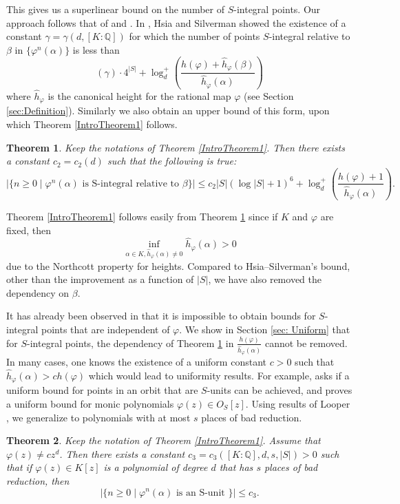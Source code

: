 \documentclass[10pt, reqno]{amsart}
\newcommand{\bb}{\mathbb}
\newcommand{\vphi}{\varphi}
\newcommand{\h}{\widehat{h}}
\newtheorem{theorem}{Theorem}
\numberwithin{theorem}{section}
\numberwithin{equation}{section}
\numberwithin{example}{section}
\numberwithin{definition}{section}
\begin{document}
This gives us a superlinear bound on the number of $S$-integral points.  Our approach follows that of \cite{Sil93} and \cite{HS11}. In \cite{HS11}, Hsia and Silverman showed the existence of a constant $\gamma = \gamma(d,[K:\bb{Q}])$ for which the number of points $S$-integral relative to $\beta$ in $\{\vphi^n(\alpha)\}$ is less than
$$(\gamma) \cdot 4^{|S|}  + \log_d^+ \left( \frac{h(\vphi) + \h_{\vphi}(\beta)}{\h_{\vphi}(\alpha)} \right)$$
where $\h_{\vphi}$ is the canonical height for the rational map $\vphi$ (see Section \ref{sec:Definition}). 
Similarly we also obtain an upper bound of this form, upon which Theorem \ref{IntroTheorem1} follows. 

\begin{theorem} \label{IntroTheorem3}
Keep the notations of Theorem \ref{IntroTheorem1}. Then there exists a constant $c_2 = c_2(d)$ such that the following is true: 
$$|\{ n \geq 0 \mid \vphi^n(\alpha) \text{ is S-integral relative to } \beta\}| \leq c_2 |S| (\log |S|+1)^6 + \log_d^+ \left(\frac{h(\vphi) + 1}{\h_{\vphi}(\alpha)} \right).$$
\end{theorem}

Theorem \ref{IntroTheorem1} follows easily from Theorem \ref{IntroTheorem3} since if $K$ and $\vphi$ are fixed, then 
$$\inf_{\alpha \in K, \h_{\vphi}(\alpha) \not = 0} \h_{\vphi}(\alpha) > 0$$
due to the Northcott property for heights. Compared to Hsia--Silverman's bound, other than the improvement as a function of $|S|$, we have also removed the dependency on $\beta$. 
\par 
It has already been observed in \cite{KLS15} that it is impossible to obtain  bounds for $S$-integral points that are independent of $\vphi$. We show in Section \ref{sec: Uniform} that for $S$-integral points, the dependency of Theorem \ref{IntroTheorem3} in $\frac{h(\vphi)}{\h_{\vphi}(\alpha)}$ cannot be removed. In many cases, one knows the existence of a uniform constant $c > 0$ such that $\h_{\vphi}(\alpha) > c h(\vphi)$ which would lead to uniformity results. For example, \cite{KLS15} asks if a uniform bound for points in an orbit that are $S$-units can be achieved, and proves a uniform bound for monic polynomials $\vphi(z) \in O_S[z]$. Using results of Looper \cite{Loo19}, we generalize \cite[Theorem 1.7]{KLS15} to polynomials with at most $s$ places of bad reduction.


\begin{theorem} \label{IntroTheorem4}
Keep the notation of Theorem \ref{IntroTheorem1}. Assume that $\vphi(z) \not = cz^{d}$. Then there exists a constant $c_3 = c_3([K:\bb{Q}],d,s,|S|) > 0$ such that if $\vphi(z) \in K[z]$ is a polynomial of degree $d$ that has $s$ places of bad reduction, then 
$$\left| \{n \geq 0 \mid \vphi^n(\alpha) \text{ is an S-unit } \}\right| \leq c_3.$$
\end{theorem}
\end{document}
